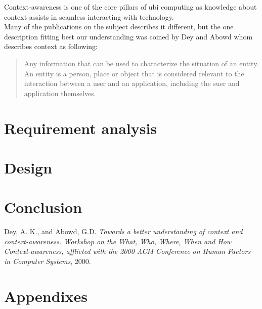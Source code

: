 \documentclass[]{report}
\begin{document}
Context-awareness is one of the core pillars of ubi computing as knowledge about context assists in seamless interacting with technology. \\
 

Many of the publications on the subject describes it different, but the one description fitting best our understanding was coined by Dey and Abowd whom describes context as following:

\blockquote{
	Any information that can be used to characterize the situation of an entity. An entity is a person, place or object that is considered relevant to the interaction between a user and an application, including the suer and application themselves. \cite{Dey and Abowd (2000)} 
} 



  

\chapter{Requirement analysis}
\chapter{Design}
\chapter{Conclusion}

\begin{thebibliography}{9}

  Dey, A. K., and Abowd, G.D.
  \emph{Towards a better understanding of context and context-awareness. Workshop on the What, Who, Where, When and How Context-awareness, afflicted with the 2000 ACM Conference on Human Factors in Computer Systems},
  2000.

\end{thebibliography}
\chapter{Appendixes}
\end{document}
